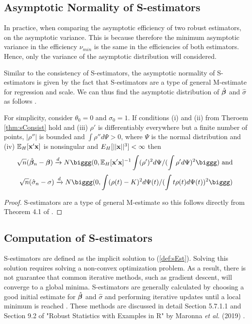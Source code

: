 \subsection{Asymptotic Normality of S-estimators}

In practice, when comparing the asymptotic efficiency of two robust estimators, on the asymptotic variance. This is because therefore the minimum asymptotic variance in the efficiency $\nu_{min}$ is the same in the efficiencies of both estimators. Hence, only the variance of the asymptotic distribution will considered.

Similar to the consistency of S-estimators, the asymptotic normality of S-estimators is given by the fact that S-estimators are a type of general M-estimate for regression and scale. We can thus find the asymptotic distribution of $\hat{\bm{\beta}}$ and $\hat\sigma$ as follows \cite{rousseeuw1984robust}.
\begin{thm}
For simplicity, consider $\theta_0 = 0$ and $\sigma_0=1$. If conditions (i) and (ii) from Theroem \ref{thm:sConsist} hold and (iii) $\rho'$ is differentiably everywhere but a finite number of points, $|\rho''|$ is bounded and $\int \rho'' d\Psi > 0$, where $\Psi$ is the normal distribution and (iv) $\mathbb{E}_H[\mathbf{x}'\mathbf{x}]$ is nonsingular and $E_H[||\mathbf{x}||^3] < \infty$ then
\begin{equation}
    \sqrt{n} (\hat\bb_n - \bb) \xrightarrow{d} N\biggg(0, \E_H[\bx'\bx]^{-1} \int (\rho')^2d\Psi / (\int\rho' d\Psi)^2\biggg)\text{ and }
\end{equation}
\begin{equation}
    \sqrt{n} (\hat\sigma_n - \sigma) \xrightarrow{d} N\biggg(0, \int (\rho(t) - K)^2d\Psi(t) / (\int t\rho(t) d\Psi(t))^2\biggg)
\end{equation}
\end{thm}
\begin{proof}
S-estimators are a type of general M-estimate so this follows directly from Theorem 4.1 of \cite{maronna1981asymptotic}.
\end{proof}

\subsection{Computation of S-estimators}
S-estimators are defined as the implicit solution to (\ref{def:sEst}). Solving this solution requires solving a non-convex optimization problem. As a result, there is not guarantee that common iterative methods, such as gradient descent, will converge to a global minima. S-estimators are generally calculated by choosing a good initial estimate for $\hat{\bm{\beta}}$ and $\hat\sigma$ and performing iterative updates until a local minimum is reached \cite{maronna2019robust}. These methods are discussed in detail Section 5.7.1.1 and Section 9.2 of "Robust Statistics with Examples in R" by Maronna \textit{et al.} (2019) \cite{maronna2019robust}.

